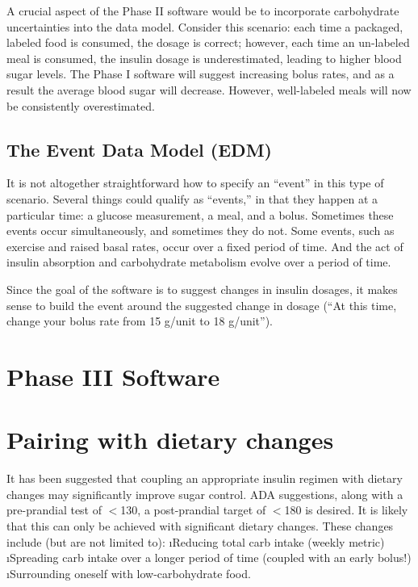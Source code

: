 A crucial aspect of the Phase II software would be to incorporate carbohydrate  uncertainties into the 
data model. Consider this scenario: each time a packaged, labeled food is consumed, the dosage is 
correct; however, each time an un-labeled meal is consumed, the insulin dosage is underestimated, 
leading to higher blood sugar levels. The Phase I software will suggest increasing bolus rates, and 
as a result the average blood sugar will decrease. However, well-labeled meals will now be 
consistently overestimated.

\subsection{The Event Data Model (EDM)}

It is not altogether straightforward how to specify an ``event'' in this type of scenario. Several 
things could qualify as ``events,'' in that they happen at a particular time: a glucose measurement, 
a meal, and a bolus. Sometimes these events occur simultaneously, and sometimes they do not. Some 
events, such as exercise and raised basal rates, occur over a fixed period of time. And the act of 
insulin absorption and carbohydrate metabolism evolve over a period of time.

Since the goal of the software is to suggest changes in insulin dosages, it makes sense to build the 
event around the suggested change in dosage (``At this time, change your bolus rate from 15 g/unit 
to 18 g/unit''). 

\section{Phase III Software}

\section{Pairing with dietary changes}
It has been suggested that coupling an appropriate insulin regimen with dietary changes may 
significantly improve sugar control. ADA suggestions, along with a pre-prandial test of $<$130, 
a post-prandial target of $<$180 is desired. It is likely that this can only be achieved with 
significant dietary changes. These changes include (but are not limited to):
\bi
	\i Reducing total carb intake (weekly metric)
	\i Spreading carb intake over a longer period of time (coupled with an early bolus!)
	\i Surrounding oneself with low-carbohydrate food.
\ei

